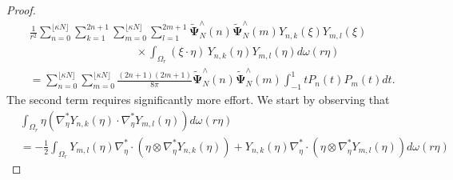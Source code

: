 \documentclass[a4paper, 10pt]{article}
\numberwithin{equation}{section}
\theoremstyle{definition}
\begin{document}
\begin{proof}
\begin{align}\label{eqn:firstsum}
&\frac{1}{r^2}\sum_{n=0}^{\lfloor \kappa N\rfloor}\sum_{k=1}^{2n+1}\sum_{m=0}^{{\lfloor \kappa N\rfloor}}\sum_{l=1}^{2m+1}\tilde{\mathbf{\Psi}}_N^\wedge(n)\tilde{\mathbf{\Psi}}_N^\wedge(m)Y_{n,k}\left(\xi \right)Y_{m,l}\left(\xi \right)
\\&\qquad\qquad\qquad\qquad\quad\,\,\,\times\int_{\Omega_r}(\xi \cdot\eta)\, Y_{n,k}\left(\eta \right)Y_{m,l}\left(\eta \right)d\omega(r\eta)\nonumber
\\&=\sum_{n=0}^{\lfloor \kappa N\rfloor}\sum_{m=0}^{{\lfloor \kappa N\rfloor}}\frac{(2n+1)(2m+1)}{8\pi}\tilde{\mathbf{\Psi}}_N^\wedge(n)\tilde{\mathbf{\Psi}}_N^\wedge(m)\int_{-1}^1tP_{n}\left(t\right)P_{m}\left(t\right)dt.\nonumber
\end{align}
The second term requires significantly more effort. We start by observing that
\begin{align}
&\int_{\Omega_r}\eta \left(\nabla^*_{\eta }Y_{n,k}\left(\eta \right)\cdot\nabla^*_{\eta }Y_{m,l}\left(\eta \right)\right)d\omega(r\eta)\label{eqn:1green}
\\&=-\frac{1}{2}\int_{\Omega_r}Y_{m,l}\left(\eta \right)\nabla_{\eta }^*\cdot\left(\eta \otimes\nabla^*_{\eta }Y_{n,k}\left(\eta \right)\right)+Y_{n,k}\left(\eta \right)\nabla_{\eta }^*\cdot\left(\eta \otimes\nabla^*_{\eta }Y_{m,l}\left(\eta \right)\right)d\omega(r\eta)\nonumber
\end{align}


\end{proof}
\end{document}
